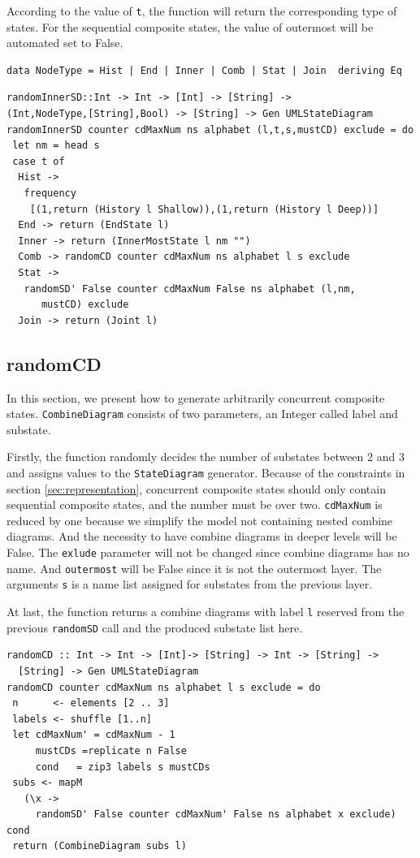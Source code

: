 According to the value of \verb|t|, the function will return the corresponding type of states.
For the sequential composite states, the value of outermost will be automated set to False.

\begin{verbatim}
data NodeType = Hist | End | Inner | Comb | Stat | Join  deriving Eq
\end{verbatim}

\begin{verbatim}
randomInnerSD::Int -> Int -> [Int] -> [String] ->
(Int,NodeType,[String],Bool) -> [String] -> Gen UMLStateDiagram
randomInnerSD counter cdMaxNum ns alphabet (l,t,s,mustCD) exclude = do
 let nm = head s
 case t of 
  Hist -> 
   frequency 
    [(1,return (History l Shallow)),(1,return (History l Deep))]
  End -> return (EndState l)
  Inner -> return (InnerMostState l nm "")
  Comb -> randomCD counter cdMaxNum ns alphabet l s exclude
  Stat -> 
   randomSD' False counter cdMaxNum False ns alphabet (l,nm,
      mustCD) exclude
  Join -> return (Joint l)
\end{verbatim}




\subsection{randomCD}
\label{subsec:randomCD}
In this section, we present how to generate arbitrarily concurrent composite states. 
\verb|CombineDiagram| consists of two parameters, an Integer called label and substate.

Firstly, the function randomly decides the number of substates between 2 and 3 and assigns values to the \verb|StateDiagram| generator.
Because of the constraints in section \ref{sec:representation}, concurrent composite states should only contain sequential composite states, and the number must be over two.
\verb|cdMaxNum| is reduced by one because we simplify the model not containing nested combine diagrams.
And the necessity to have combine diagrams in deeper levels will be False. The \verb|exlude| parameter will not be changed since combine diagrams has no name.
And \verb|outermost| will be False since it is not the outermost layer. 
The arguments \verb|s| is a name list assigned for substates from the previous layer.

At last, the function returns a combine diagrams with label \verb|l| reserved from the previous \verb|randomSD| call and the produced substate list here.
\begin{verbatim}
randomCD :: Int -> Int -> [Int]-> [String] -> Int -> [String] ->
  [String] -> Gen UMLStateDiagram
randomCD counter cdMaxNum ns alphabet l s exclude = do
 n      <- elements [2 .. 3]
 labels <- shuffle [1..n]
 let cdMaxNum' = cdMaxNum - 1
     mustCDs =replicate n False
     cond   = zip3 labels s mustCDs
 subs <- mapM 
   (\x ->
     randomSD' False counter cdMaxNum' False ns alphabet x exclude) cond
 return (CombineDiagram subs l)
\end{verbatim}


